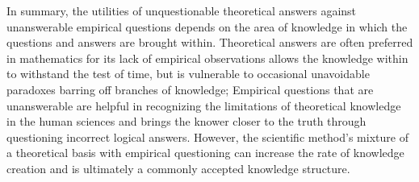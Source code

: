 \documentclass[a4paper,12pt]{article}
\begin{document}
In summary, the utilities of unquestionable theoretical answers against unanswerable empirical questions depends on the area of knowledge in which the questions and answers are brought within. Theoretical answers are often preferred in mathematics for its lack of empirical observations allows the knowledge within to withstand the test of time, but is vulnerable to occasional unavoidable paradoxes barring off branches of knowledge; Empirical questions that are unanswerable are helpful in recognizing the limitations of theoretical knowledge in the human sciences and brings the knower closer to the truth through questioning incorrect logical answers. However, the scientific method's mixture of a theoretical basis with empirical questioning can increase the rate of knowledge creation and is ultimately a commonly accepted knowledge structure.


\newpage
\printbibliography



















\end{document}
